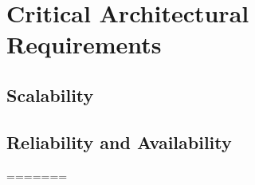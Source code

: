 \documentclass[a4paper,12pt,titlepage]{article}
\begin{document}


\tableofcontents
\newpage

%

\section{Critical Architectural Requirements}




\subsection{Scalability}


\subsection{Reliability and Availability}

=======







\end{document}
